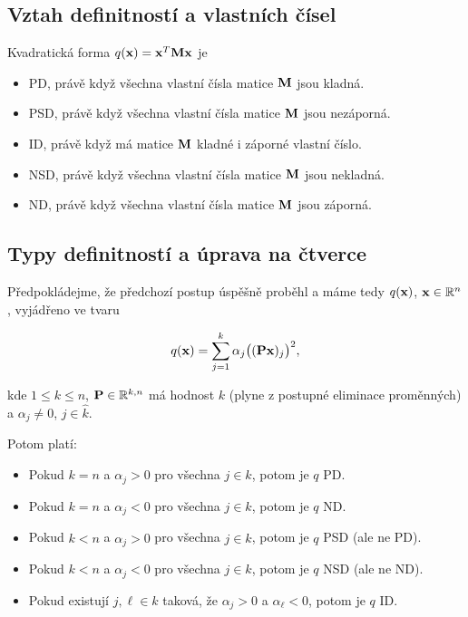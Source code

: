 \subsection*{Vztah definitností a vlastních čísel}

Kvadratická forma $q(\mathbf{x}) = \mathbf{x}^T \mathbf{M} \mathbf{x}$ je

\begin{itemize}
    \item PD, právě když všechna vlastní čísla matice $\mathbf{M}$ jsou kladná.
    \item PSD, právě když všechna vlastní čísla matice $\mathbf{M}$ jsou nezáporná.
    \item ID, právě když má matice $\mathbf{M}$ kladné i záporné vlastní číslo.
    \item NSD, právě když všechna vlastní čísla matice $\mathbf{M}$ jsou nekladná.
    \item ND, právě když všechna vlastní čísla matice $\mathbf{M}$ jsou záporná.
\end{itemize}

\subsection*{Typy definitností a úprava na čtverce}

Předpokládejme, že předchozí postup úspěšně proběhl a máme tedy $q(\mathbf{x})$,
$\mathbf{x}\in\mathbb{R}^n$, vyjádřeno ve tvaru

\[ q(\mathbf{x}) = \sum_{j=1}^k \alpha_j \big( (\mathbf{P} \mathbf{x})_j  \big)^2, \]

\noindent kde $1 \leq k \leq n$, $\mathbf{P} \in \mathbb{R}^{k, n}$ má hodnost $k$ (plyne z postupné eliminace proměnných) a $\alpha_j \neq 0$, $j\in\hat{k}$.

\noindent Potom platí:

\begin{itemize}
    \item Pokud $k = n$ a $\alpha_j > 0$ pro všechna $j \in \hat{k}$, potom je $q$ PD.
    \item Pokud $k = n$ a $\alpha_j < 0$ pro všechna $j \in \hat{k}$, potom je $q$ ND.
    \item Pokud $k < n$ a $\alpha_j > 0$ pro všechna $j \in \hat{k}$, potom je $q$ PSD
          (ale ne PD).
    \item Pokud $k < n$ a $\alpha_j < 0$ pro všechna $j \in \hat{k}$, potom je $q$ NSD
          (ale ne ND).
    \item Pokud existují $j,\ell \in \hat{k}$ taková, že $\alpha_j > 0$ a $\alpha_\ell <
              0$, potom je $q$ ID.
\end{itemize}


